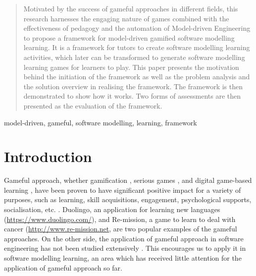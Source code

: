 \documentclass[conference]{IEEEtran}
\begin{document}
\maketitle

\begin{abstract}
\label{abstract}
Motivated by the success of gameful approaches in different fields, this research harnesses the engaging nature of games combined with the effectiveness of pedagogy and the automation of Model-driven Engineering to propose a framework for model-driven gamified software modelling learning. It is a framework for tutors to create software modelling learning activities, which later can be transformed to generate software modelling learning games for learners to play. This paper presents the motivation behind the initiation of the framework as well as the problem analysis and the solution overview in realising the framework. The framework is then demonstrated to show how it works. Two forms of assessments are then presented as the evaluation of the framework.
\end{abstract}

\begin{IEEEkeywords} 
model-driven, gameful, software modelling, learning, framework
\end{IEEEkeywords}



%
\IEEEpeerreviewmaketitle

\section{Introduction}
Gameful approach, whether gamification \cite{stieglitz2016gamification}, serious games \cite{dorner2016serious}, and digital game-based learning \cite{san2015games}, have been proven to have significant positive impact for a variety of purposes, such as learning, skill acquisitions, engagement, psychological supports, socialisation, etc. \cite{connolly2012systematic, hamari2014does}. Duolingo, an application for learning new languages (\url{https://www.duolingo.com/}), and Re-mission, a game to learn to deal with cancer (\url{http://www.re-mission.net}, are two popular examples of the gameful approaches. On the other side, the application of gameful approach in software engineering has not been studied extensively \cite{Pedreira2015}. This encourages us to apply it in software modelling learning, an area which has received little attention for the application of gameful approach so far. 
\end{document}

